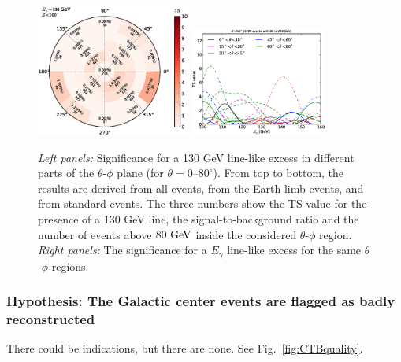 \documentclass[aps,twocolumn,prd,superscriptaddress,showpacs,nofootinbib,fixfloat]{revtex4}
\newcommand{\GeV}{{\rm ~GeV}}
\begin{document}
\begin{figure}[p]
  \includegraphics[width=0.45\textwidth]{plots/polar_z.LE.100.eps}
  \includegraphics[width=0.40\textwidth]{plots/scan_z.LE.100.eps}
  \caption{\emph{Left panels:} Significance for a 130 GeV line-like excess in different parts of
  the $\theta$-$\phi$ plane (for $\theta=0$--$80^\circ$). From top to bottom,
  the results are derived from all events, from the Earth limb events, and
  from standard events. The three numbers
  show the TS value for the presence of a 130 GeV line, the
  signal-to-background ratio and the number of events above $80\GeV$ inside
  the considered $\theta$-$\phi$ region. \emph{Right panels:} The significance
  for a $E_\gamma$ line-like excess for the same $\theta$-$\phi$ regions.}
  \label{fig:polarPlotsAll}
\end{figure}

\subsubsection{Hypothesis: The Galactic center events are flagged as badly
reconstructed}

There could be indications, but there are none. See Fig.~\ref{fig:CTBquality}.
\text
\end{document}
